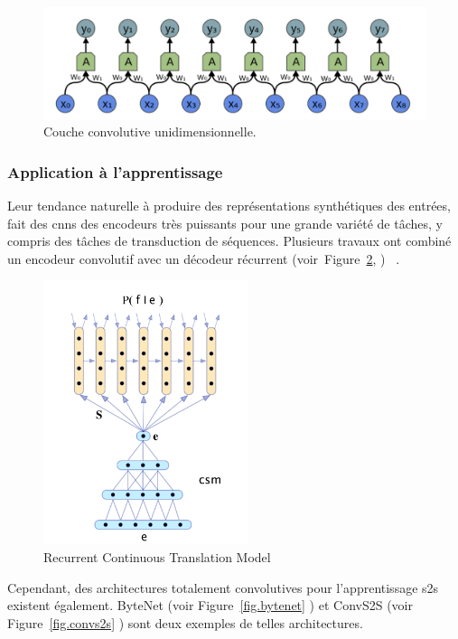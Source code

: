 \begin{figure}[hbt]
    \begin{center}
        \includegraphics[width=\textwidth]{assets/images/conv1d.png}
    \end{center}    
    \caption{Couche convolutive unidimensionnelle.}
    \label{fig.layer-conv1d}
\end{figure}


\subsubsection{Application à l'apprentissage }

Leur tendance naturelle à produire des représentations synthétiques des entrées,
fait des \glspl{cnn} des encodeurs très puissants pour une grande variété de tâches,
y compris des tâches de transduction de séquences.
Plusieurs travaux ont combiné un encodeur convolutif avec un décodeur récurrent%
(voir~Figure~\ref{fig.rctm}, )%
~\cite{deep-nmt-survey}.

\begin{figure}[hbt]
    \centering
    \includegraphics[width=6cm]{assets/images/ctrm.png}
    \caption{Recurrent Continuous Translation Model}
    \label{fig.rctm}
\end{figure}

Cependant, des architectures totalement convolutives pour l'apprentissage \gls{s2s} existent également.
ByteNet (voir Figure~\ref{fig.bytenet}
)
et ConvS2S (voir Figure~\ref{fig.convs2s}
)
sont deux exemples de telles architectures.


